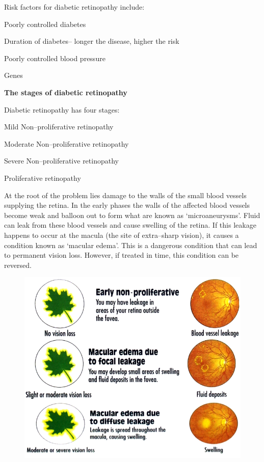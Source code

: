 Risk factors for diabetic retinopathy include:

\item Poorly controlled diabetes

 \item Duration of diabetes– longer the disease, higher the risk

 \item Poorly controlled blood pressure

 \item Genes

\textbf{The stages of diabetic retinopathy}

Diabetic retinopathy has four stages:

\item Mild Non–proliferative retinopathy

 \item Moderate Non–proliferative retinopathy

 \item Severe Non–proliferative retinopathy

 \item Proliferative retinopathy

At the root of the problem lies damage to the walls of the small blood vessels supplying the retina. In the early phases the walls of the affected blood vessels become weak and balloon out to form what are known as ‘microaneurysms’. Fluid can leak from these blood vessels and cause swelling of the retina. If this leakage happens to occur at the macula (the site of extra–sharp vision), it causes a condition known as ‘macular edema’. This is a dangerous condition that can lead to permanent vision loss. However, if treated in time, this condition can be reversed.

\begin{figure}
\caption{}
\includegraphics{images/054.jpg}
\end{figure}


